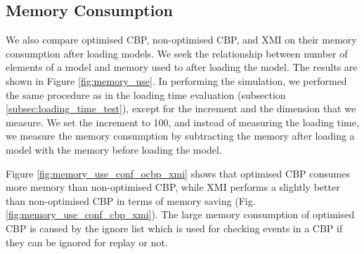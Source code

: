 \documentclass{llncs}
\begin{document}
         
\subsection{Memory Consumption}
\label{subsec:memory_consumption}

We also compare optimised CBP, non-optimised CBP, and XMI on their memory consumption after loading models. We seek the relationship between number of elements of a model and memory used to after loading the model. The results are shown in Figure \ref{fig:memory_use}. In performing the simulation, we performed the same procedure as in the loading time evaluation (subsection \ref{subsec:loading_time_test}), except for the increment and the dimension that we measure. We set the increment to 100, and instead of measuring the loading time, we measure the memory consumption by subtracting the memory after loading a model with the memory before loading the model.   

Figure \ref{fig:memory_use_conf_ocbp_xmi} shows that optimised CBP consumes more memory than non-optimised CBP, while XMI performs a slightly better than non-optimised CBP in terms of memory saving (Fig. \ref{fig:memory_use_conf_cbp_xmi}). The large memory consumption of optimised CBP is caused by the ignore list which is used for checking events in a CBP if they can be ignored for replay or not. %
\end{document}
